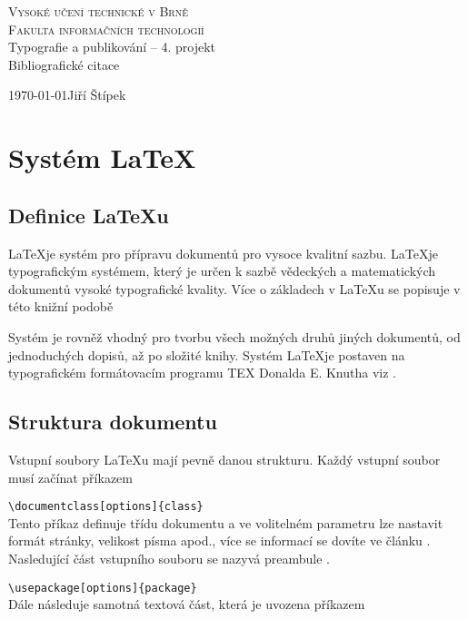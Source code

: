 \documentclass[a4paper, 11pt]{article}
\begin{document}
\begin{titlepage}
\begin{center}

    {\Huge \textsc{Vysoké učení technické v Brně}}\\[0.4em]
    {\huge \textsc{Fakulta informačních technologií}}\\
    {\LARGE Typografie a publikování -- 4. projekt\\[0.3em]
    {\Huge Bibliografické citace}}
\end{center}
{\Large \today \hfill Jiří Štípek}
\end{titlepage}
\newpage
\section{Systém \LaTeX}

\subsection{Definice \LaTeX u}
\LaTeX \;je systém pro přípravu dokumentů pro vysoce kvalitní sazbu. \LaTeX \;je typografickým systémem, který je určen k sazbě vědeckých a matematických dokumentů vysoké typografické kvality. Více o základech v \LaTeX u se popisuje v této knižní podobě \cite{Rybicka2003}

Systém je rovněž vhodný pro tvorbu všech možných druhů jiných dokumentů, od jednoduchých dopisů, až po složité knihy. Systém \LaTeX \;je postaven na typografickém formátovacím programu TEX Donalda E. Knutha viz \cite{Bartlik2017thesis}.
\subsection{Struktura dokumentu}
Vstupní soubory \LaTeX u mají pevně danou strukturu. Každý vstupní soubor musí začínat příkazem

\verb-\documentclass[options]{class}-\\
Tento příkaz definuje třídu dokumentu a ve volitelném parametru lze nastavit formát stránky,
velikost písma apod., více se informací se dovíte ve článku \cite{Lehocky2014}. Nasledující část vstupního souboru se nazyvá preambule \cite{pieters_2016}. 

\verb-\usepackage[options]{package}-\\
Dále následuje samotná textová část, která je uvozena příkazem
\end{document}
